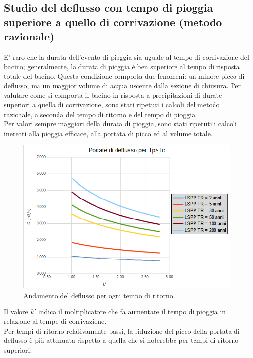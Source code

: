\subsection{Studio del deflusso con tempo di pioggia superiore a quello di corrivazione (metodo razionale)}
E' raro che la durata dell'evento di pioggia sia uguale al tempo di corrivazione del bacino; generalmente, la durata di pioggia è ben superiore al tempo di risposta totale del bacino. Questa condizione comporta due fenomeni: un minore picco di deflusso, ma un maggior volume di acqua uscente dalla sezione di chiusura.
Per valutare come si comporta il bacino in risposta a precipitazioni di durate superiori a quella di corrivazione, sono stati ripetuti i calcoli del metodo razionale, a seconda del tempo di ritorno e del tempo di pioggia.\\
Per valori sempre maggiori della durata di pioggia, sono stati ripetuti i calcoli inerenti alla pioggia efficace, alla portata di picco ed al volume totale.
\begin{figure}[H]  \centering
    \includegraphics[scale=0.75]{immagini/deflusso_tp_tc.png}
    \caption{Andamento del deflusso per ogni tempo di ritorno.}
    \label{metodo_razionale_cn_c}
\end{figure}
Il valore $k'$ indica il moltiplicatore che fa aumentare il tempo di pioggia in relazione al tempo di corrivazione.\\
Per tempi di ritorno relativamente bassi, la riduzione del picco della portata di deflusso è più attenuata rispetto a quella che si noterebbe per tempi di ritorno superiori.

